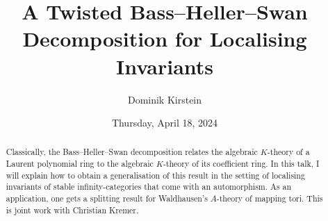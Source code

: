\documentclass{UAmathtalk}
\author{Dominik Kirstein}
\title{A Twisted Bass–Heller–Swan Decomposition for Localising Invariants}
\date{Thursday, April 18, 2024}
\begin{document}
\maketitle

\begin{abstract}
Classically, the Bass–Heller–Swan decomposition relates the \mbox{algebraic} $K$-theory of a Laurent polynomial ring to the algebraic $K$-theory of its coefficient ring. In this talk, I will explain how to obtain a generalisation of this result in the setting of localising invariants of stable infinity-categories that come with an automorphism. As an application, one gets a splitting result for Waldhausen’s $A$-theory of mapping tori. This is joint work with Christian Kremer.
\end{abstract}
\end{document}
